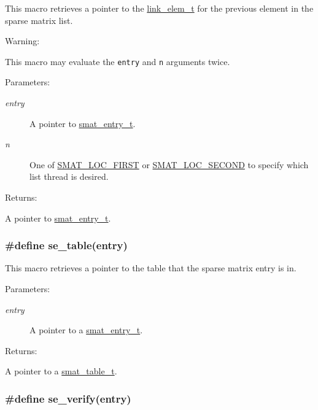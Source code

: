 This macro retrieves a pointer to the \hyperlink{group__dbprim__link_a1}{link\_\-elem\_\-t} for the previous element in the sparse matrix list.

\begin{Desc}
\item[Warning: ]\par
This macro may evaluate the {\tt entry} and {\tt n} arguments twice.\end{Desc}
\begin{Desc}
\item[Parameters: ]\par
\begin{description}
\item[{\em 
entry}]A pointer to \hyperlink{group__dbprim__smat_a2}{smat\_\-entry\_\-t}. \item[{\em 
n}]One of \hyperlink{group__dbprim__smat_a47a135}{SMAT\_\-LOC\_\-FIRST} or \hyperlink{group__dbprim__smat_a47a136}{SMAT\_\-LOC\_\-SECOND} to specify which list thread is desired.\end{description}
\end{Desc}
\begin{Desc}
\item[Returns: ]\par
A pointer to \hyperlink{group__dbprim__smat_a2}{smat\_\-entry\_\-t}. \end{Desc}
\hypertarget{group__dbprim__smat_a39}{
\subsubsection[se\_\-table]{\setlength{\rightskip}{0pt plus 5cm}\#define se\_\-table(entry)}}
\label{group__dbprim__smat_a39}


This macro retrieves a pointer to the table that the sparse matrix entry is in.\begin{Desc}
\item[Parameters: ]\par
\begin{description}
\item[{\em 
entry}]A pointer to a \hyperlink{group__dbprim__smat_a2}{smat\_\-entry\_\-t}.\end{description}
\end{Desc}
\begin{Desc}
\item[Returns: ]\par
A pointer to a \hyperlink{group__dbprim__smat_a0}{smat\_\-table\_\-t}. \end{Desc}
\hypertarget{group__dbprim__smat_a38}{
\subsubsection[se\_\-verify]{\setlength{\rightskip}{0pt plus 5cm}\#define se\_\-verify(entry)}}
\label{group__dbprim__smat_a38}


